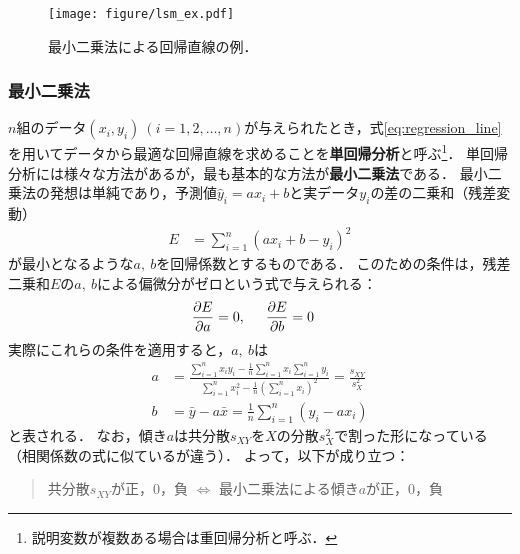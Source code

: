 %
\begin{figure}[H]
	\centering
	\texttt{[image: figure/lsm\_ex.pdf]}
	\caption{最小二乗法による回帰直線の例．}
	\label{fig:lsm}
\end{figure}
%


%
\subsubsection*{最小二乗法}
%
$ n $組のデータ$ (x_{i}, y_{i})\ (i=1, 2, \ldots, n) $が与えられたとき，式\eqref{eq:regression_line}を用いてデータから最適な回帰直線を求めることを\textbf{単回帰分析}と呼ぶ\footnote{説明変数が複数ある場合は重回帰分析と呼ぶ．}．
%
単回帰分析には様々な方法があるが，最も基本的な方法が\textbf{最小二乗法}である．
%
最小二乗法の発想は単純であり，予測値$ \hat{y}_{i}=ax_{i}+b $と実データ$ y_{i} $の差の二乗和（残差変動）
%
\begin{align*}
	E &= \sum_{i=1}^{n}(ax_{i}+b-y_{i})^{2}
\end{align*}
%
が最小となるような$ a,\ b $を回帰係数とするものである．
%
このための条件は，残差二乗和$ E $の$ a,\ b $による偏微分がゼロという式で与えられる：
%
\begin{align*}
	\frac{\partial E}{\partial a} &= 0, \hspace{0.5cm} \frac{\partial E}{\partial b} = 0 
\end{align*}
%
実際にこれらの条件を適用すると，$ a,\ b $は
%
\begin{align*}
	a &=\frac{\displaystyle\sum_{i=1}^{n} x_{i}y_{i} - \frac{1}{n} \sum_{i=1}^{n}x_{i}\sum_{i=1}^{n}y_{i}}{\displaystyle\sum_{i=1}^{n}x_{i}^{2} - \frac{1}{n} \left(\sum_{i=1}^{n}x_{i}\right)^{2}}=\frac{s_{XY}}{s^{2}_{X}}\\[10pt]
	b &= \bar{y} - a \bar{x} = \frac{1}{n} \sum_{i=1}^{n}(y_{i} - ax_{i})
\end{align*}
%
と表される．
%
なお，傾き$ a $は共分散$ s_{XY} $を$ X $の分散$ s^{2}_{X} $で割った形になっている（相関係数の式に似ているが違う）．
%
よって，以下が成り立つ：
%
\begin{quotation}
共分散$ s_{XY} $が正，0，負 $ \Longleftrightarrow $ 最小二乗法による傾き$ a $が正，0，負
\end{quotation}
%
%

